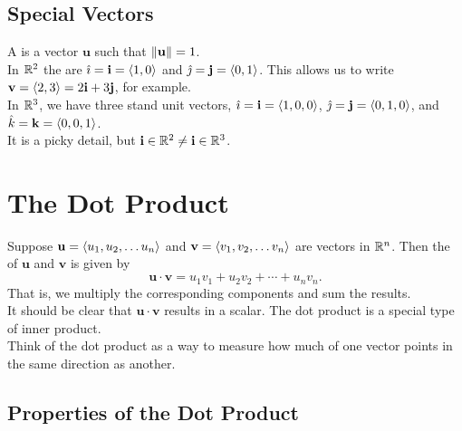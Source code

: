 \subsection{Special Vectors}

A  is a vector \(\mathbf{u}\) such that \(\left\lVert \mathbf{u}\right\rVert = 1\). \\

In \(\mathbb{R}^{2}\) the  are \(\hat{\imath} = \mathbf{i} = \left\langle 1,0 \right\rangle\) and \(\hat{\jmath} = \mathbf{j} = \left\langle 0,1 \right\rangle\). This allows us to write \(\mathbf{v} = \left\langle 2,3 \right\rangle = 2\mathbf{i} + 3\mathbf{j}\), for example. \\

In \(\mathbb{R}^{3}\), we have three stand unit vectors, \(\hat{\imath} = \mathbf{i} = \left\langle 1,0,0 \right\rangle\), \(\hat{\jmath} = \mathbf{j} = \left\langle 0,1,0 \right\rangle\), and \(\hat{k} = \mathbf{k} = \left\langle 0,0,1 \right\rangle\).  \\

It is a picky detail, but \(\mathbf{i} \in \mathbb{R}^{2} \ne \mathbf{i} \in \mathbb{R}^{3}\). 

\section{The Dot Product}

Suppose \(\mathbf{u} = \left\langle u_{1},u_{2},\dots u_{n} \right\rangle\) and \(\mathbf{v} = \left\langle v_{1},v_{2},\dots v_{n} \right\rangle\) are vectors in \(\mathbb{R}^{n}\). Then the  of \(\mathbf{u}\) and \(\mathbf{v}\) is given by
\[
    \mathbf{u} \cdot \mathbf{v} = u_{1}v_{1} + u_{2}v_{2} + \cdots + u_{n}v_{n}.
\]
That is, we multiply the corresponding components and sum the results. \\

It should be clear that \(\mathbf{u} \cdot \mathbf{v}\) results in a scalar. The dot product is a special type of inner product. \\

Think of the dot product as a way to measure how much of one vector points in the same direction as another.

\subsection{Properties of the Dot Product}


